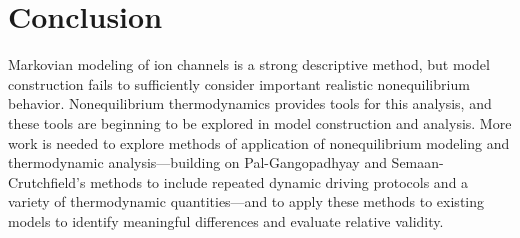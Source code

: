 \documentclass[%
 aip,
 amsmath,amssymb,
 reprint,%
]{revtex4-1}
\begin{document}
\section{Conclusion}
Markovian modeling of ion channels is a strong descriptive method, but model construction fails to sufficiently consider important realistic nonequilibrium behavior. Nonequilibrium thermodynamics provides tools for this analysis, and these tools are beginning to be explored in model construction and analysis. More work is needed to explore methods of application of nonequilibrium modeling and thermodynamic analysis---building on Pal-Gangopadhyay and Semaan-Crutchfield's methods to include repeated dynamic driving protocols and a variety of thermodynamic quantities---and to apply these methods to existing models to identify meaningful differences and evaluate relative validity.

\nocite{*}

\end{document}
